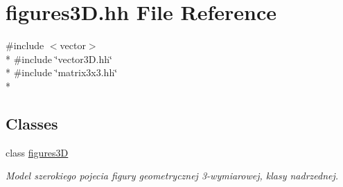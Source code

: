 \hypertarget{figures3_d_8hh}{}\section{figures3\+D.\+hh File Reference}
\label{figures3_d_8hh}
{\ttfamily \#include $<$vector$>$}\\*
{\ttfamily \#include \char`\"{}vector3\+D.\+hh\char`\"{}}\\*
{\ttfamily \#include \char`\"{}matrix3x3.\+hh\char`\"{}}\\*
\subsection*{Classes}
\begin{DoxyCompactItemize}
\item 
class \hyperlink{classfigures3_d}{figures3D}
\begin{DoxyCompactList}\small\item\em Model szerokiego pojecia figury geometrycznej 3-\/wymiarowej, klasy nadrzednej. \end{DoxyCompactList}\end{DoxyCompactItemize}
